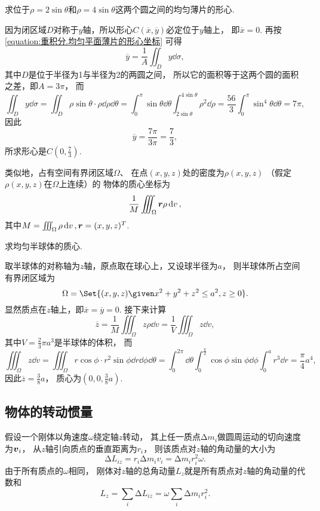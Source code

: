 \begin{example}
求位于\(\rho=2\sin\theta\)和\(\rho=4\sin\theta\)这两个圆之间的均匀薄片的形心.
\begin{solution}
因为闭区域\(D\)对称于\(y\)轴，所以形心\(C(\overline{x},\overline{y})\)必定位于\(y\)轴上，
即\(\overline{x} = 0\).
再按\cref{equation:重积分.均匀平面薄片的形心坐标} 可得\[
	\overline{y} = \frac1A \iint_D y \dd\sigma,
\]
其中\(D\)是位于半径为1与半径为2的两圆之间，
所以它的面积等于这两个圆的面积之差，即\(A = 3\pi\)，
而\[
	\iint_D y \dd\sigma = \iint_D \rho\sin\theta \cdot \rho\dd\rho\dd\theta
	= \int_0^\pi \sin\theta \dd\theta \int_{2\sin\theta}^{4\sin\theta} \rho^2 \dd\rho
	= \frac{56}3 \int_0^\pi \sin^4\theta \dd\theta
	= 7\pi,
\]
因此\[
	\overline{y} = \frac{7\pi}{3\pi} = \frac73,
\]
所求形心是\(C\left( 0,\frac73 \right)\).
\end{solution}
\end{example}

类似地，占有空间有界闭区域\(\Omega\)、
在点\((x,y,z)\)处的密度为\(\rho(x,y,z)\)
（假定\(\rho(x,y,z)\)在\(\Omega\)上连续）的
物体的质心坐标为\begin{equation}
	\frac1M \iiint_\Omega \boldsymbol{r} \rho \dd{v},
\end{equation}
其中\(M = \iiint_\Omega \rho \dd{v},
\boldsymbol{r} = (x,y,z)^T\).

\begin{example}
求均匀半球体的质心.
\begin{solution}
取半球体的对称轴为\(z\)轴，原点取在球心上，又设球半径为\(a\)，
则半球体所占空间有界闭区域为\[
	\Omega = \Set{
		(x,y,z)
		\given
		x^2+y^2+z^2 \leq a^2,
		z \geq 0
	}.
\]
显然质点在\(z\)轴上，即\(\overline{x} = \overline{y} = 0\).
接下来计算\[
	\overline{z} = \frac1M \iiint_\Omega z \rho \dd{v}
	= \frac1V \iiint_\Omega z \dd{v},
\]
其中\(V = \frac23 \pi a^3\)是半球体的体积，
而\[
	\iiint_\Omega z \dd{v}
	= \iiint_\Omega r\cos\phi \cdot r^2 \sin\phi \dd{r}\dd\phi\dd\theta
	= \int_0^{2\pi} \dd\theta \int_0^{\frac\pi2} \cos\phi \sin\phi \dd\phi
	\int_0^a r^3 \dd{r}
	= \frac\pi4 a^4,
\]
因此\(\overline{z} = \frac38 a\)，
质心为\(\left( 0,0,\frac38a \right)\).
\end{solution}
\end{example}

\subsection{物体的转动惯量}
假设一个刚体以角速度\(\omega\)绕定轴\(z\)转动，
其上任一质点\(\increment m_i\)做圆周运动的切向速度为\(\boldsymbol{v}_i\)，
从\(z\)轴引向质点的垂直距离为\(r_i\)，
则该质点对\(z\)轴的角动量的大小为\[
	\increment L_{iz}
	= r_i \increment m_i v_i
	= \increment m_i r_i^2 \omega.
\]
由于所有质点的\(\omega\)相同，
刚体对\(z\)轴的总角动量\(L_z\)就是所有质点对\(z\)轴的角动量的代数和\[
	L_z = \sum_i \increment L_{iz}
	= \omega \sum_i \increment m_i r_i^2.
\]

